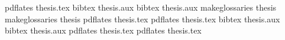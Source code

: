 pdflates thesis.tex
bibtex thesis.aux
bibtex thesis.aux
makeglossaries thesis
makeglossaries thesis
pdflates thesis.tex
pdflates thesis.tex
bibtex thesis.aux
bibtex thesis.aux
pdflates thesis.tex
pdflates thesis.tex


